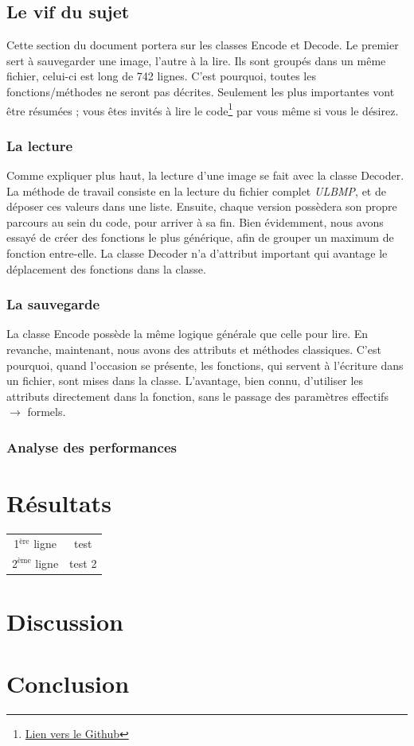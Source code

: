 \documentclass[utf8]{article}
\begin{document}
\subsection{Le vif du sujet}
Cette section du document portera sur les classes Encode et Decode. Le premier sert à sauvegarder une image, l’autre à la lire. Ils sont groupés dans un même fichier, celui-ci est long de 742 lignes. C’est pourquoi, toutes les fonctions/méthodes ne seront pas décrites. Seulement les plus importantes vont être résumées ; vous êtes invités à lire le code\footnote{\href{https://github.com/Swilic/thePillar.git}{Lien vers le Github}} par vous même si vous le désirez.

\subsubsection{La lecture}
Comme expliquer plus haut, la lecture d’une image se fait avec la classe Decoder. La méthode de travail consiste en la lecture du fichier complet \textit{ULBMP}, et de déposer ces valeurs dans une liste. Ensuite, chaque version possèdera son propre parcours au sein du code, pour arriver à sa fin. Bien évidemment, nous avons essayé de créer des fonctions le plus générique, afin de grouper un maximum de fonction entre-elle. La classe Decoder n’a d’attribut important qui avantage le déplacement des fonctions dans la classe.

\subsubsection{La sauvegarde}
La classe Encode possède la même logique générale que celle pour lire. En revanche, maintenant, nous avons des attributs et méthodes classiques. C’est pourquoi, quand l’occasion se présente, les fonctions, qui servent à l’écriture dans un fichier, sont mises dans la classe. L’avantage, bien connu, d’utiliser les attributs directement dans la fonction, sans le passage des paramètres effectifs \begin{math} \rightarrow \end{math} formels.

\subsubsection{Analyse des performances}

\section{Résultats}

\begin{center}
\begin{tabular}{|c|c|}
\hline
1$^{\text{ère}}$ ligne & test \cite{nobug} \\
2$^{\text{ème}}$ ligne & test 2 \\
\hline
\end{tabular}
\end{center}

\section{Discussion}

\section{Conclusion}



\end{document}
